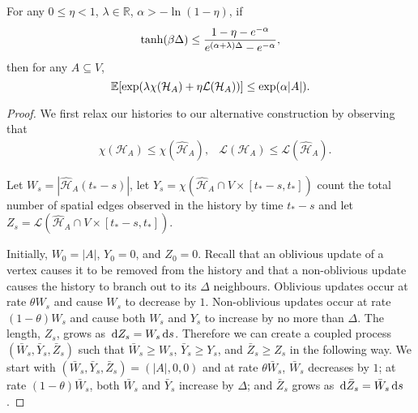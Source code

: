 	\begin{lemma}
		\label{lem:full submartingale thing}
		For any $0 \leq \eta < 1$, $\lambda \in \mathbb{R}$, $\alpha > -\ln(1 - \eta)$, if
		\begin{equation}
			\tanh(\beta\Delta) \leq \frac{1 - \eta - e^{-\alpha}}{e^{(\alpha+\lambda)\Delta} - e^{-\alpha}},
		\end{equation}
		then for any $A \subseteq V$,
		\begin{equation}
			\mathbb{E}[\exp(\lambda \chi(\mathcal{H}_A) + \eta \mathcal{L}(\mathcal{H}_A))] \leq \exp(\alpha |A|).
		\end{equation}
	\end{lemma}
	\begin{proof}
		We first relax our histories to our alternative construction by observing that
		\begin{align}
			&\chi(\mathcal{H}_A) \leq \chi(\hat{\mathcal{H}}_A), &\mathcal{L}(\mathcal{H}_A) \leq \mathcal{L}(\hat{\mathcal{H}}_A).
		\end{align}


		Let $W_s = |\hat{\mathcal{H}}_A (t_* - s)|$, let $Y_s = \chi(\hat{\mathcal{H}}_A \cap V \times [t_* - s, t_*])$ count the total number of spatial edges observed in the history by time $t_* - s$ and let $Z_s = \mathcal{L}(\hat{\mathcal{H}}_A \cap V \times [t_* - s, t_*])$. 

		Initially, $W_0 = |A|$, $Y_0 = 0$, and $Z_0 = 0$. Recall that an oblivious update of a vertex causes it to be removed from the history and that a non-oblivious update causes the history to branch out to its $\Delta$ neighbours. Oblivious updates occur at rate $\theta W_s$ and cause $W_s$ to decrease by $1$. Non-oblivious updates occur at rate $(1 - \theta)W_s$ and cause both $W_s$ and $Y_s$ to increase by no more than $\Delta$. The length, $Z_s$, grows as $\, \mathrm{d} Z_s = W_s \, \mathrm{d} s$. Therefore we can create a coupled process $(\bar{W}_s, \bar{Y}_s, \bar{Z}_s)$ such that $\bar{W}_s \geq W_s$, $\bar{Y}_s \geq Y_s$, and $\bar{Z}_s \geq Z_s$ in the following way. We start with $(\bar{W}_s, \bar{Y}_s, \bar{Z}_s) = (|A|, 0, 0)$ and at rate $\theta \bar{W}_s$, $\bar{W}_s$ decreases by $1$; at rate $(1 - \theta)\bar{W}_s$, both $\bar{W}_s$ and $\bar{Y}_s$ increase by $\Delta$; and $\bar{Z}_s$ grows as $\, \mathrm{d} \bar{Z}_s = \bar{W}_s \, \mathrm{d} s$.


\end{proof}
